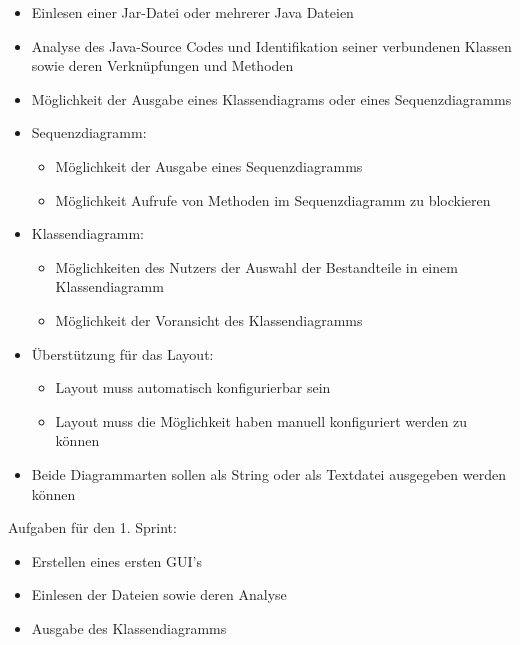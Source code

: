 \begin{itemize}
\item Einlesen einer Jar-Datei oder mehrerer Java Dateien
\item Analyse des Java-Source Codes und Identifikation seiner verbundenen Klassen sowie deren Verknüpfungen und Methoden
\item Möglichkeit der Ausgabe eines Klassendiagrams oder eines Sequenzdiagramms
\item Sequenzdiagramm:
\begin{itemize}
	\item Möglichkeit der Ausgabe eines Sequenzdiagramms
	\item Möglichkeit Aufrufe von Methoden im Sequenzdiagramm zu blockieren
\end{itemize}	
\item Klassendiagramm:
\begin{itemize}
	\item Möglichkeiten des Nutzers der Auswahl der Bestandteile in einem Klassendiagramm
	\item Möglichkeit der Voransicht des Klassendiagramms
\end{itemize}	
\item Überstützung für das Layout:
\begin{itemize}
	\item Layout muss automatisch konfigurierbar sein
	\item Layout muss die Möglichkeit haben manuell konfiguriert werden zu können
\end{itemize}	
\item Beide Diagrammarten sollen als String oder als Textdatei ausgegeben werden können
\end{itemize}

Aufgaben für den 1. Sprint:
\begin{itemize}
\item Erstellen eines ersten GUI’s
\item Einlesen der Dateien sowie deren Analyse
\item Ausgabe des Klassendiagramms
\end{itemize}

\nsecend
